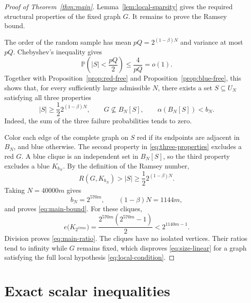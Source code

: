 \documentclass[11pt,leqno]{amsart}
\numberwithin{equation}{section}
\theoremstyle{definition}
\theoremstyle{remark}
\newcommand{\Prob}{\mathbb P}
\newcommand{\abs}[1]{\lvert#1\rvert}
\begin{document}
\begin{proof}[Proof of Theorem~\ref{thm:main}]
Lemma~\ref{lem:local-sparsity} gives the required structural properties of the fixed graph $G$. It remains to prove the Ramsey bound.

The order of the random sample has mean $pQ=2^{(1-\beta)N}$ and variance at most $pQ$. Chebyshev's inequality gives
\begin{equation}\label{eq:sample-size}
 \Prob\left(\abs S<\frac{pQ}{2}\right)
 \le\frac4{pQ}=o(1).
\end{equation}
Together with Proposition~\ref{prop:red-free} and Proposition~\ref{prop:blue-free}, this shows that, for every sufficiently large admissible $N$, there exists a set $S\subseteq U_N$ satisfying all three properties
\begin{equation}\label{eq:three-properties}
 \abs S\ge\frac12 2^{(1-\beta)N},\qquad
 G\nsubseteq B_N[S],\qquad
 \alpha(B_N[S])<b_N.
\end{equation}
Indeed, the sum of the three failure probabilities tends to zero.

Color each edge of the complete graph on $S$ red if its endpoints are adjacent in $B_N$, and blue otherwise. The second property in \eqref{eq:three-properties} excludes a red $G$. A blue clique is an independent set in $B_N[S]$, so the third property excludes a blue $K_{b_N}$. By the definition of the Ramsey number,
\[
 R(G,K_{b_N})>\abs S\ge\frac12 2^{(1-\beta)N}.
\]
Taking $N=40000m$ gives
\[
 b_N=2^{570m},\qquad (1-\beta)N=1144m,
\]
and proves \eqref{eq:main-bound}. For these cliques,
\[
 e\bigl(K_{2^{570m}}\bigr)
 =\frac{2^{570m}(2^{570m}-1)}2<2^{1140m-1}.
\]
Division proves \eqref{eq:main-ratio}. The cliques have no isolated vertices. Their ratios tend to infinity while $G$ remains fixed, which disproves \eqref{eq:size-linear} for a graph satisfying the full local hypothesis \eqref{eq:local-condition}.
\end{proof}

\appendix
\section{Exact scalar inequalities}\label{app:scalars}
\end{document}
